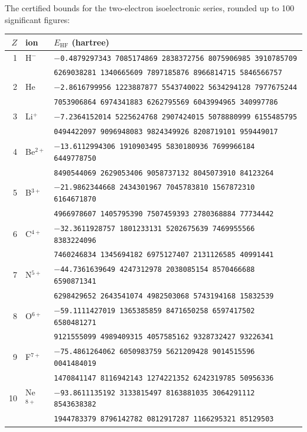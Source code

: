 The certified bounds for the two-electron isoelectronic series, rounded up to 100 significant figures:

\begin{tabular}{rll}
$Z$ & ion & $E_\mathrm{HF}$ (hartree) \\ \hline
1 & H$^-$ & \texttt{$-$0.4879297343 7085174869 2838372756 8075906985 3910785709} \\
 & & \texttt{\phantom{$-$0.}6269038281 1340665609 7897185876 8966814715 5846566757} \\
2 & He & \texttt{$-$2.8616799956 1223887877 5543740022 5634294128 7977675244} \\
 & & \texttt{\phantom{$-$2.}7053906864 6974341883 6262795569 6043994965 340997786} \\
3 & Li$^+$ & \texttt{$-$7.2364152014 5225624768 2907424015 5078880999 6155485795} \\
 & & \texttt{\phantom{$-$7.}0494422097 9096948083 9824349926 8208719101 959449017} \\
4 & Be$^{2+}$ & \texttt{$-$13.6112994306 1910903495 5830180936 7699966184 6449778750} \\
 & & \texttt{\phantom{$-$13.}8490544069 2629053406 9058737132 8045073910 84123264} \\
5 & B$^{3+}$ & \texttt{$-$21.9862344668 2434301967 7045783810 1567872310 6164671870} \\
 & & \texttt{\phantom{$-$21.}4966978607 1405795390 7507459393 2780368884 77734442} \\
6 & C$^{4+}$ & \texttt{$-$32.3611928757 1801233131 5202675639 7469955566 8383224096} \\
 & & \texttt{\phantom{$-$32.}7460246834 1345694182 6975127407 2131126585 40991441} \\
7 & N$^{5+}$ & \texttt{$-$44.7361639649 4247312978 2038085154 8570466688 6590871341} \\
 & & \texttt{\phantom{$-$44.}6298429652 2643541074 4982503068 5743194168 15832539} \\
8 & O$^{6+}$ & \texttt{$-$59.1111427019 1365385859 8471650258 6597417502 6580481271} \\
 & & \texttt{\phantom{$-$59.}9121555099 4989409315 4057585162 9328732427 93226341} \\
9 & F$^{7+}$ & \texttt{$-$75.4861264062 6050983759 5621209428 9014515596 0041484019} \\
 & & \texttt{\phantom{$-$75.}1470841147 8116942143 1274221352 6242319785 50956336} \\
10 & Ne$^{8+}$ & \texttt{$-$93.8611135192 3133815497 8163881035 3064291112 8543638382} \\
 & & \texttt{\phantom{$-$93.}1944783379 8796142782 0812917287 1166295321 85129503} \\
\end{tabular}
